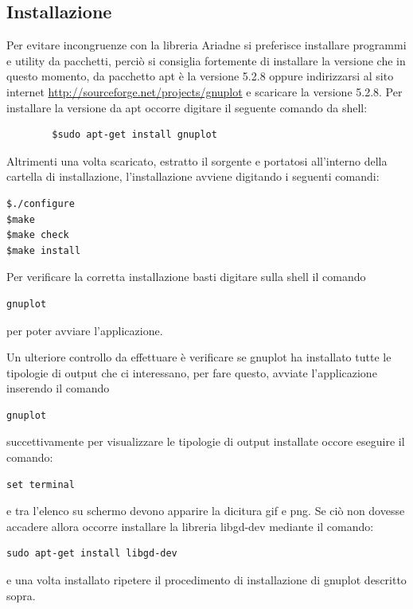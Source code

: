 \documentclass{article}
\begin{document}

\subsection{Installazione}
Per evitare incongruenze con la libreria Ariadne si preferisce installare programmi e utility da pacchetti, perciò si consiglia fortemente di installare la versione che in questo momento, da pacchetto apt è la versione 5.2.8 oppure indirizzarsi al sito internet \url{http://sourceforge.net/projects/gnuplot} e scaricare la versione 5.2.8.\newline
Per installare la versione da apt occorre digitare il seguente comando da shell:
\begin{commandline}
	\begin{verbatim}
		$sudo apt-get install gnuplot
	\end{verbatim}
\end{commandline}

Altrimenti una volta scaricato, estratto il sorgente e portatosi all'interno della cartella di installazione, l'installazione avviene digitando i seguenti comandi:\newline
\begin{commandline}
\begin{verbatim}
$./configure
$make
$make check
$make install
\end{verbatim}
\end{commandline}
Per verificare la corretta installazione basti digitare sulla shell il comando 
\begin{verbatim}
gnuplot
\end{verbatim}
per poter avviare l'applicazione.\newline

Un ulteriore controllo da effettuare è verificare se gnuplot ha installato tutte le tipologie di output che ci interessano, per fare questo, avviate l'applicazione inserendo il comando 
\begin{verbatim}
gnuplot
\end{verbatim}
succettivamente per visualizzare le tipologie di output installate occore eseguire il comando:
\begin{verbatim}
set terminal
\end{verbatim}
e tra l'elenco su schermo devono apparire la dicitura gif e png. Se ciò non dovesse accadere allora occorre installare la libreria libgd-dev mediante il comando:
\begin{verbatim}
sudo apt-get install libgd-dev
\end{verbatim}
e una volta installato ripetere il procedimento di installazione di gnuplot descritto sopra.
\end{document}
